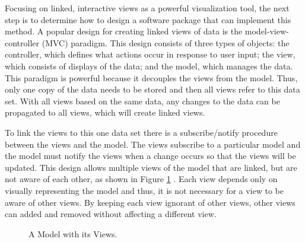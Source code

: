 \documentclass{article}[11pt]
\begin{document}
Focusing on linked, interactive views as a powerful visualization tool, the
next step is to determine how to design a software package that can implement
this method.  A popular design for creating linked views of data is the
model-view-controller (MVC) paradigm.  This design consists of three types
of objects: the controller, which defines what actions occur in response to
user input; the view, which consists of displays of the data; and the model,
which manages the data.  This paradigm is powerful because it decouples the
views from the model.  Thus, only one copy of the data needs to be stored and
then all views refer to this data set.  With all views based on the same data,
any changes to the data can be propagated to all views, which will create
linked views. 

To link the views to this one data set there is a subscribe/notify procedure
between the views and the model.  The views subscribe to a particular model
and the model must notify the views when a change occurs so that the views
will be updated.  This design allows multiple views of the model that are
linked, but are not aware of each other, as shown in Figure \ref{Fig:ExMVC}
\cite{DesignPatterns}.  Each view depends only on visually representing the
model and thus, it is not necessary for a view to be aware of other views.  By
keeping each view ignorant of other views, other views can added and removed
without affecting a different view.

\begin{figure}[ht]
  \begin{center}
    \caption{ A Model with its Views. }
    \label{Fig:ExMVC}
  \end{center}
\end{figure}
\end{document}
